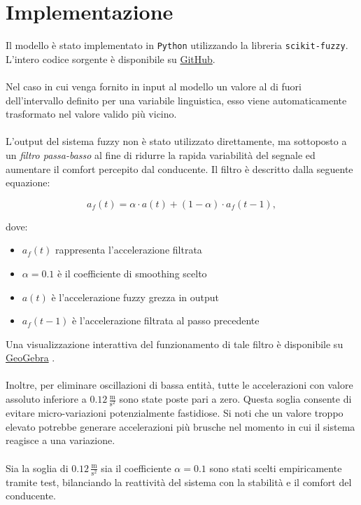 \chapter{Implementazione}
\label{cha:implementazione}

Il modello è stato implementato in \texttt{Python} utilizzando la libreria \texttt{scikit-fuzzy}.  
L'intero codice sorgente è disponibile su \href{https://github.com/Leso246/FuzzyACC}{GitHub}.
\\\\
\noindent Nel caso in cui venga fornito in input al modello un valore al di fuori dell'intervallo
definito per una variabile linguistica, esso viene automaticamente trasformato nel valore valido più vicino.
\\\\
\noindent L'output del sistema fuzzy non è stato utilizzato direttamente, ma sottoposto a un \emph{filtro passa-basso} 
al fine di ridurre la rapida variabilità del segnale ed aumentare il comfort percepito dal conducente.  
Il filtro è descritto dalla seguente equazione:

\[
a_{f}(t) = \alpha \cdot a(t) + (1 - \alpha) \cdot a_{f}(t-1),
\]

\noindent dove:
\begin{itemize}
    \item $a_{f}(t)$ rappresenta l'accelerazione filtrata
    \item $\alpha = 0.1$ è il coefficiente di smoothing scelto
    \item $a(t)$ è l'accelerazione fuzzy grezza in output
    \item $a_{f}(t-1)$ è l'accelerazione filtrata al passo precedente
\end{itemize}
Una visualizzazione interattiva del funzionamento di tale filtro è disponibile 
su \href{https://www.geogebra.org/m/tb88mqrm}{GeoGebra} \cite{geogebraEWMA}.
\\\\
\noindent Inoltre, per eliminare oscillazioni di bassa entità, tutte le accelerazioni con valore assoluto inferiore a $0.12 \, \frac{\mathrm{m}}{\mathrm{s^2}}$ 
sono state poste pari a zero.  
Questa soglia consente di evitare micro-variazioni potenzialmente fastidiose. Si noti che un valore troppo elevato potrebbe
generare accelerazioni più brusche nel momento in cui il sistema reagisce a una variazione.
\\\\
\noindent Sia la soglia di $0.12 \,\frac{\mathrm{m}}{\mathrm{s^2}}$ sia il coefficiente $\alpha = 0.1$ sono stati scelti empiricamente tramite test, 
bilanciando la reattività del sistema con la stabilità e il comfort del conducente.

